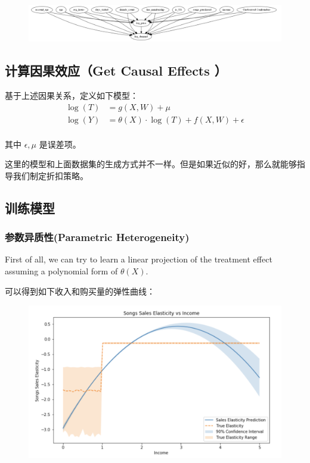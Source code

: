 \documentclass[12pt]{article}
\begin{document}
\begin{figure}[H]
    \centering
    \includegraphics[width=1\textwidth]{fig/Casual_Inference_Microsoft_Example_3.png}
\end{figure}

\subsection{计算因果效应（Get Causal Effects ）}
基于上述因果关系，定义如下模型：
\begin{align*}
\log(T) &= g(X,W) + \mu \\
\log(Y) &= \theta(X) \cdot \log(T) + f(X,W) + \epsilon \\
\end{align*}

其中 $\epsilon, \mu$ 是误差项。

这里的模型和上面数据集的生成方式并不一样。但是如果近似的好，那么就能够指导我们制定折扣策略。

\subsection{训练模型}
\subsubsection{参数异质性(Parametric Heterogeneity)}
First of all, we can try to learn a linear projection of the treatment effect assuming a polynomial form of $\theta(X)$. 

可以得到如下收入和购买量的弹性曲线：
\begin{figure}[H]
    \centering
    \includegraphics[width=.6\textwidth]{fig/Casual_Inference_Microsoft_Example_4.png}
\end{figure}
\end{document}
